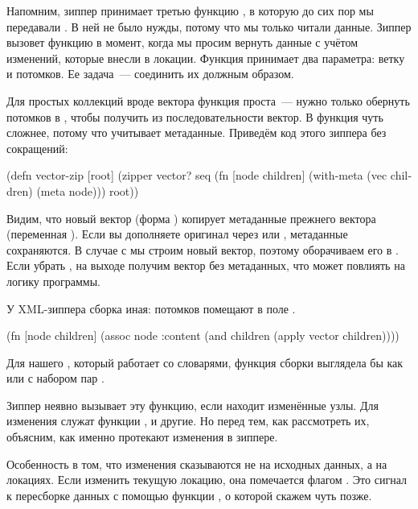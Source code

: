 Напомним, зиппер принимает третью функцию , в которую до сих пор мы
передавали . В ней не было нужды, потому что мы только читали
данные. Зиппер вызовет функцию в момент, когда мы просим вернуть данные с учётом
изменений, которые внесли в локации. Функция принимает два параметра: ветку и
потомков. Ее задача~--- соединить их должным образом.

Для простых коллекций вроде вектора функция проста~--- нужно только обернуть
потомков в , чтобы получить из последовательности вектор. В 
функция чуть сложнее, потому что учитывает метаданные. Приведём код этого
зиппера без сокращений:

\begin{english}
  \begin{clojure}
(defn vector-zip
  [root]
  (zipper vector?
          seq
          (fn [node children]
            (with-meta (vec children) (meta node)))
          root))
  \end{clojure}
\end{english}

Видим, что новый вектор (форма ) копирует метаданные прежнего
вектора (переменная ). Если вы дополняете оригинал через  или
, метаданные сохраняются. В случае с  мы строим новый вектор,
поэтому оборачиваем его в . Если убрать , на выходе
получим вектор без метаданных, что может повлиять на логику программы.

У XML-зиппера сборка иная: потомков помещают в поле .

\begin{english}
  \begin{clojure}
(fn [node children]
  (assoc node :content
              (and children (apply vector children))))
  \end{clojure}
\end{english}

Для нашего , который работает со словарями, функция сборки выглядела бы
как  или  с набором пар .

Зиппер неявно вызывает эту функцию, если находит изменённые узлы. Для изменения
служат функции ,  и другие. Но перед тем, как рассмотреть
их, объясним, как именно протекают изменения в зиппере.

Особенность в том, что изменения сказываются не на исходных данных, а на
локациях. Если изменить текущую локацию, она помечается флагом . Это
сигнал к пересборке данных с помощью функции , о которой скажем чуть
позже.

